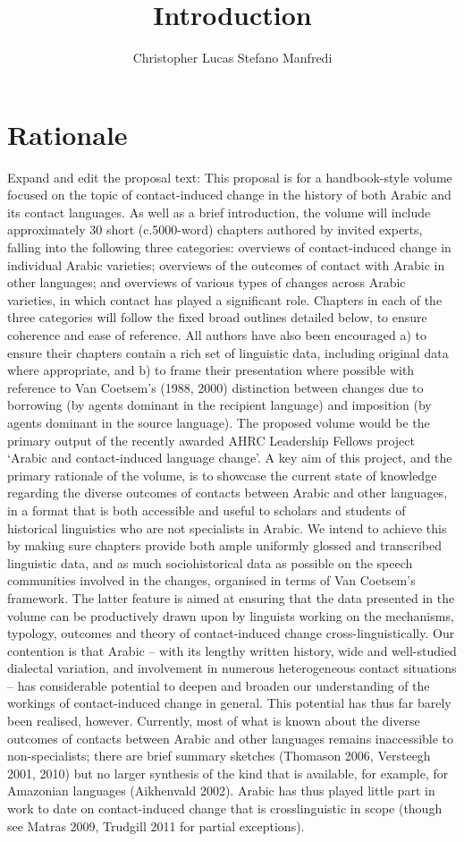 \documentclass[output=paper]{langsci/langscibook}
\author{Christopher Lucas\affiliation{SOAS University of London}\lastand 
 Stefano Manfredi\affiliation{CNRS, SeDyL}
}
\title{Introduction}
\begin{document}
\section{Rationale}
Expand and edit the proposal text:
This proposal is for a handbook-style volume focused on the topic of contact-induced change in the history of both Arabic and its contact languages. As well as a brief introduction, the volume will include approximately 30 short (c.5000-word) chapters authored by invited experts, falling into the following three categories: overviews of contact-induced change in individual Arabic varieties; overviews of the outcomes of contact with Arabic in other languages; and overviews of various types of changes across Arabic varieties, in which contact has played a significant role.
Chapters in each of the three categories will follow the fixed broad outlines detailed below, to ensure coherence and ease of reference. All authors have also been encouraged a) to ensure their chapters contain a rich set of linguistic data, including original data where appropriate, and b) to frame their presentation where possible with reference to Van Coetsem’s (1988, 2000) distinction between changes due to borrowing (by agents dominant in the recipient language) and imposition (by agents dominant in the source language). 
The proposed volume would be the primary output of the recently awarded AHRC Leadership Fellows project ‘Arabic and contact-induced language change’. A key aim of this project, and the primary rationale of the volume, is to showcase the current state of knowledge regarding the diverse outcomes of contacts between Arabic and other languages, in a format that is both accessible and useful to scholars and students of historical linguistics who are not specialists in Arabic. We intend to achieve this by making sure chapters provide both ample uniformly glossed and transcribed linguistic data, and as much sociohistorical data as possible on the speech communities involved in the changes, organised in terms of Van Coetsem’s framework. The latter feature is aimed at ensuring that the data presented in the volume can be productively drawn upon by linguists working on the mechanisms, typology, outcomes and theory of contact-induced change cross-linguistically.
Our contention is that Arabic – with its lengthy written history, wide and well-studied dialectal variation, and involvement in numerous heterogeneous contact situations – has considerable potential to deepen and broaden our understanding of the workings of contact-induced change in general. This potential has thus far barely been realised, however. Currently, most of what is known about the diverse outcomes of contacts between Arabic and other languages remains inaccessible to non-specialists; there are brief summary sketches (Thomason 2006, Versteegh 2001, 2010) but no larger synthesis of the kind that is available, for example, for Amazonian languages (Aikhenvald 2002). Arabic has thus played little part in work to date on contact-induced change that is crosslinguistic in scope (though see Matras 2009, Trudgill 2011 for partial exceptions). 
\end{document}
